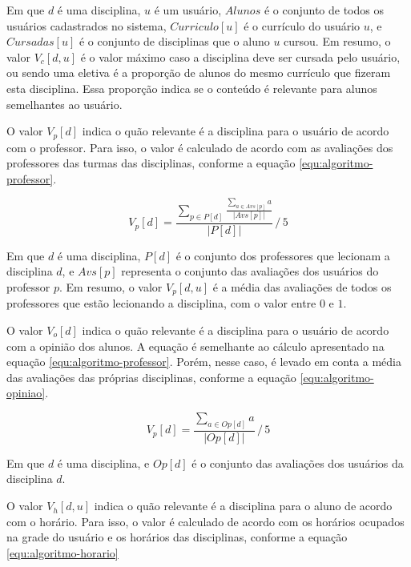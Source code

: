 Em que $d$ é uma disciplina, $u$ é um usuário, $Alunos$ é o conjunto de todos os usuários cadastrados no sistema, $Curriculo[u]$ é o currículo do usuário $u$, e $Cursadas[u]$ é o conjunto de disciplinas que o aluno $u$ cursou. Em resumo, o valor $V_c[d,u]$ é o valor máximo caso a disciplina deve ser cursada pelo usuário, ou sendo uma eletiva é a proporção de alunos do mesmo currículo que fizeram esta disciplina. Essa proporção indica se o conteúdo é relevante para alunos semelhantes ao usuário.


O valor $V_p[d]$ indica o quão relevante é a disciplina para o usuário de acordo com o professor. Para isso, o valor é calculado de acordo com as avaliações dos professores das turmas das disciplinas, conforme a equação \ref{equ:algoritmo-professor}.

\begin{equation}
    V_p[d] = \frac{\sum_{p \in P[d]} \displaystyle  \frac{\sum_{a \in Avs[p]} a}{| Avs[p] |}}{| P[d] |} \,/\, 5
    \label{equ:algoritmo-professor}
\end{equation}

Em que $d$ é uma disciplina, $P[d]$ é o conjunto dos professores que lecionam a disciplina $d$, e $Avs[p]$ representa o conjunto das avaliações dos usuários do professor $p$. Em resumo, o valor $V_p[d,u]$ é a média das avaliações de todos os professores que estão lecionando a disciplina, com o valor entre $0$ e $1$.


O valor $V_o[d]$ indica o quão relevante é a disciplina para o usuário de acordo com a opinião dos alunos. A equação é semelhante ao cálculo apresentado na equação \ref{equ:algoritmo-professor}. Porém, nesse caso, é levado em conta a média das avaliações das próprias disciplinas, conforme a equação \ref{equ:algoritmo-opiniao}.

\begin{equation}
    V_p[d] = \frac{\sum_{a \in Op[d]} a} {| Op[d] |} \,/\, 5
    \label{equ:algoritmo-opiniao}
\end{equation}

Em que $d$ é uma disciplina, e $Op[d]$ é o conjunto das avaliações dos usuários da disciplina $d$.


O valor $V_h[d,u]$ indica o quão relevante é a disciplina para o aluno de acordo com o horário. Para isso, o valor é calculado de acordo com os horários ocupados na grade do usuário e os horários das disciplinas, conforme a equação \ref{equ:algoritmo-horario}

